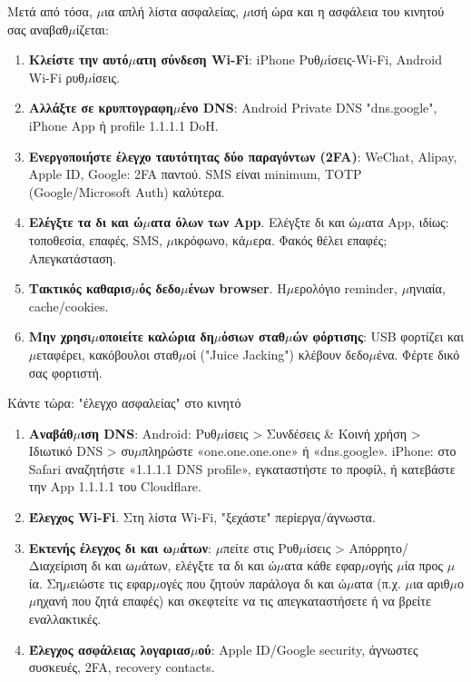 
Μετά από τόσα, $\mu$ια απλή λίστα ασφαλείας, $\mu$ισή ώρα και η ασφάλεια του κινητού σας αναβαθ$\mu$ίζεται:

\begin{enumerate}
  \item \textbf{Κλείστε την αυτό$\mu$ατη σύνδεση Wi-Fi}: iPhone Ρυθ$\mu$ίσεις-Wi-Fi, Android Wi-Fi ρυθ$\mu$ίσεις.
  \item \textbf{Αλλάξτε σε κρυπτογραφη$\mu$ένο DNS}: Android Private DNS "dns.google", iPhone App ή profile 1.1.1.1 DoH.
  \item \textbf{Ενεργοποιήστε έλεγχο ταυτότητας δύο παραγόντων (2FA)}: WeChat, Alipay, Apple ID, Google: 2FA παντού. SMS είναι minimum, TOTP (Google/Microsoft Auth) καλύτερα.
  \item \textbf{Ελέγξτε τα δι και ώ$\mu$ατα όλων των App}. Ελέγξτε δι και ώ$\mu$ατα App, ιδίως: τοποθεσία, επαφές, SMS, $\mu$ικρόφωνο, κά$\mu$ερα. Φακός θέλει επαφές; Απεγκατάσταση.
  \item \textbf{Τακτικός καθαρισ$\mu$ός δεδο$\mu$ένων browser}. Η$\mu$ερολόγιο reminder, $\mu$ηνιαία, cache/cookies.
  \item \textbf{Μην χρησι$\mu$οποιείτε καλώρια δη$\mu$όσιων σταθ$\mu$ών φόρτισης}: USB φορτίζει και $\mu$εταφέρει, κακόβουλοι σταθ$\mu$οί ("Juice Jacking") κλέβουν δεδο$\mu$ένα. Φέρτε δικό σας φορτιστή.
\end{enumerate}

\begin{tcbpractice}{Κάντε τώρα: "έλεγχο ασφαλείας" στο κινητό}
\begin{enumerate}
  \item \textbf{Αναβάθ$\mu$ιση DNS}: Android: Ρυθ$\mu$ίσεις > Συνδέσεις \& Κοινή χρήση > Ιδιωτικό DNS > συ$\mu$πληρώστε «one.one.one.one» ή «dns.google». iPhone: στο Safari αναζητήστε «1.1.1.1 DNS profile», εγκαταστήστε το προφίλ, ή κατεβάστε την App 1.1.1.1 του Cloudflare.
  \item \textbf{Έλεγχος Wi-Fi}. Στη λίστα Wi-Fi, "ξεχάστε" περίεργα/άγνωστα.
  \item \textbf{Εκτενής έλεγχος δι και ω$\mu$άτων}: $\mu$πείτε στις Ρυθ$\mu$ίσεις > Απόρρητο/Διαχείριση δι και ω$\mu$άτων, ελέγξτε τα δι και ώ$\mu$ατα κάθε εφαρ$\mu$ογής $\mu$ία προς $\mu$ία. Ση$\mu$ειώστε τις εφαρ$\mu$ογές που ζητούν παράλογα δι και ώ$\mu$ατα (π.χ. $\mu$ια αριθ$\mu$ο$\mu$ηχανή που ζητά επαφές) και σκεφτείτε να τις απεγκαταστήσετε ή να βρείτε εναλλακτικές.
  \item \textbf{Έλεγχος ασφάλειας λογαριασ$\mu$ού}: Apple ID/Google security, άγνωστες συσκευές, 2FA, recovery contacts.
\end{enumerate}

\end{tcbpractice}
